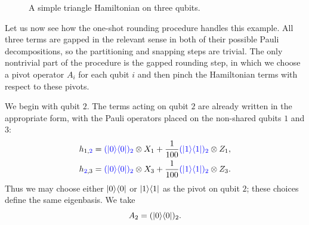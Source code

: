 \documentclass[a4paper,onecolumn,11pt]{quantumarticle}
\theoremstyle{plain}
\newcommand{\blue}[1]{{\color{blue}#1}}
\newcommand{\proj}[1]{\ket{#1}\!\bra{#1}}
\begin{document}
\begin{figure}[t]
\centering
{}
\caption{A simple triangle Hamiltonian on three qubits.}
\label{fig:triangle2}
\end{figure}

Let us now see how the one-shot rounding procedure handles this example.
All three terms are gapped in the relevant sense in both of their possible
Pauli decompositions, so the partitioning and snapping steps are trivial.
The only nontrivial part of the procedure is the gapped rounding step, in
which we choose a pivot operator $A_i$ for each qubit $i$ and then pinch
the Hamiltonian terms with respect to these pivots.

We begin with qubit $2$.  The terms acting on qubit $2$ are already
written in the appropriate form, with the Pauli operators placed on the
non-shared qubits $1$ and $3$:
\begin{align*}
    h_{1,\blue{2}}
        &= \blue{(\proj{0})_2} \otimes X_1
        + \frac{1}{100} \blue{(\proj{1})_2} \otimes Z_1, \\
    h_{\blue{2},3}
        &= \blue{(\proj{0})_2} \otimes X_3
        + \frac{1}{100} \blue{(\proj{1})_2} \otimes Z_3.
\end{align*}
Thus we may choose either $\proj{0}$ or $\proj{1}$ as the pivot on qubit
$2$; these choices define the same eigenbasis.  We take
\[
    A_2 = (\proj{0})_2 .
\]
\end{document}
